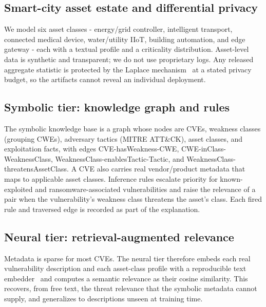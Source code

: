 \documentclass[review,3p,times]{elsarticle}
\begin{document}
\subsection{Smart-city asset estate and differential privacy}
We model six asset classes - energy/grid controller, intelligent transport,
connected medical device, water/utility IIoT, building automation, and edge
gateway - each with a textual profile and a criticality distribution.
Asset-level data is synthetic and transparent; we do not use proprietary logs.
Any released aggregate statistic is protected by the Laplace
mechanism~\cite{dwork2014dp} at a stated privacy budget, so the artifacts cannot
reveal an individual deployment.

\subsection{Symbolic tier: knowledge graph and rules}
The symbolic knowledge base is a graph whose nodes are CVEs, weakness classes
(grouping CWEs), adversary tactics (MITRE ATT\&CK), asset classes, and
exploitation facts, with edges CVE-hasWeakness-CWE, CWE-inClass-WeaknessClass,
WeaknessClass-enablesTactic-Tactic, and WeaknessClass-threatensAssetClass. A CVE
also carries real vendor/product metadata that maps to applicable asset classes.
Inference rules escalate priority for known-exploited and ransomware-associated
vulnerabilities and raise the relevance of a pair when the vulnerability's
weakness class threatens the asset's class. Each fired rule and traversed edge
is recorded as part of the explanation.

\subsection{Neural tier: retrieval-augmented relevance}
Metadata is sparse for most CVEs. The neural tier therefore embeds each real
vulnerability description and each asset-class profile with a reproducible text
embedder~\cite{nussbaum2024nomic} and computes a semantic relevance as their
cosine similarity. This recovers, from free text, the threat relevance that the
symbolic metadata cannot supply, and generalizes to descriptions unseen at
training time.
\end{document}
